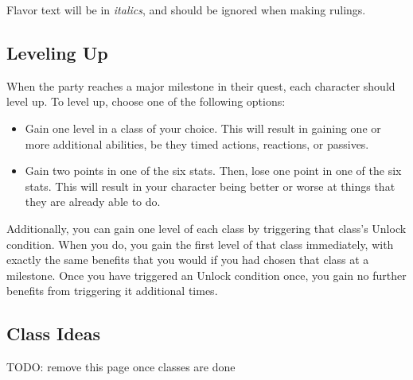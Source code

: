 \documentclass[12pt]{article}
\begin{document}
Flavor text will be in \textit{italics}, and should be ignored when making rulings.

\subsection{Leveling Up}

When the party reaches a major milestone in their quest, each character should level up. To level up, choose one of the following options:
\begin{itemize}
\item Gain one level in a class of your choice. This will result in gaining one or more additional abilities, be they timed actions, reactions, or passives.
\item Gain two points in one of the six stats. Then, lose one point in one of the six stats. This will result in your character being better or worse at things that they are already able to do.
\end{itemize}

Additionally, you can gain one level of each class by triggering that class's Unlock condition. When you do, you gain the first level of that class immediately, with exactly the same benefits that you would if you had chosen that class at a milestone. Once you have triggered an Unlock condition once, you gain no further benefits from triggering it additional times.

\pagebreak
\subsection{Class Ideas}

TODO: remove this page once classes are done
\end{document}
